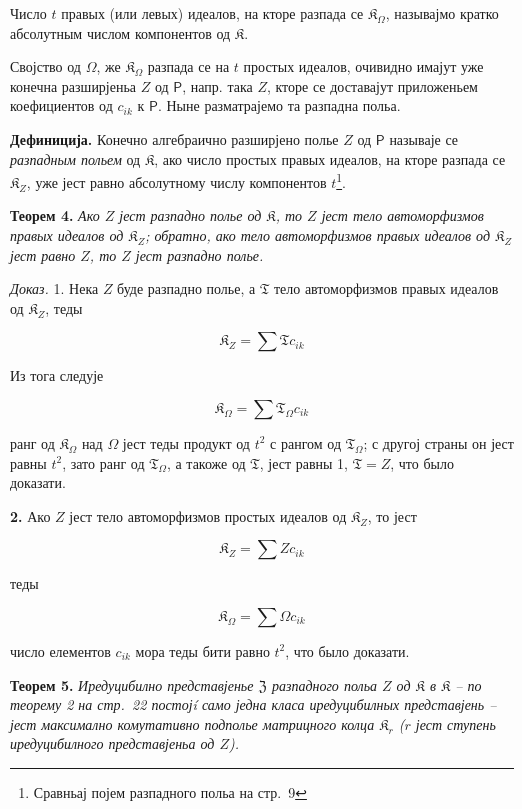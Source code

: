 \documentclass[11pt]{article}
\newcommand{\srcfn}[2]{\footnote{#2}}
\begin{document}
Число \(t\) правых (или левых) идеалов, на кторе разпада се \(\mathfrak K_\Omega\), называјмо кратко абсолутным числом компонентов од \(\mathfrak K\).

Својство од \(\Omega\), же \(\mathfrak K_\Omega\) разпада се на \(t\) простых идеалов, очивидно имајут уже конечна разширјеньа \(Z\) од \(\mathsf P\), напр. така \(Z\), кторе се доставајут приложеньем коефициентов од \(c_{ik}\) к \(\mathsf P\). Ныне разматрајемо та разпадна польа.

\textbf{Дефиниција.} Конечно алгебраично разширјено полье \(Z\) од \(\mathsf P\) называје се \emph{разпадным польем} од \(\mathfrak K\), ако число простых правых идеалов, на кторе разпада се \(\mathfrak K_Z\), уже јест равно абсолутному числу компонентов \(t\)\srcfn{1}{Сравньај појем разпадного польа на стр.~9}.

\textbf{Теорем 4.} \emph{Ако \(Z\) јест разпадно полье од \(\mathfrak K\), то \(Z\) јест тело автоморфизмов правых идеалов од \(\mathfrak K_Z\); обратно, ако тело автоморфизмов правых идеалов од \(\mathfrak K_Z\) јест равно \(Z\), то \(Z\) јест разпадно полье.}

\emph{Доказ.} 1. Нека \(Z\) буде разпадно полье, а \(\mathfrak T\) тело автоморфизмов правых идеалов од \(\mathfrak K_Z\), теды

\[
\mathfrak K_Z=\sum\mathfrak T c_{ik}
\]

Из тога следује

\[
\mathfrak K_\Omega=\sum\mathfrak T_\Omega c_{ik}
\]

ранг од \(\mathfrak K_\Omega\) над \(\Omega\) јест теды продукт од \(t^2\) с рангом од \(\mathfrak T_\Omega\); с другој страны он јест равны \(t^2\), зато ранг од \(\mathfrak T_\Omega\), а такоже од \(\mathfrak T\), јест равны 1, \(\mathfrak T=Z\), что было доказати.

\textbf{2.} Ако \(Z\) јест тело автоморфизмов простых идеалов од \(\mathfrak K_Z\), то јест

\[
\mathfrak K_Z=\sum Zc_{ik}
\]

теды

\[
\mathfrak K_\Omega=\sum\Omega c_{ik}
\]

число елементов \(c_{ik}\) мора теды бити равно \(t^2\), что было доказати.

\textbf{Теорем 5.} \emph{Иредуцибилно представјенье \(\mathfrak Z\) разпадного польа \(Z\) од \(\mathfrak K\) в \(\mathfrak K\) -- по теорему 2 на стр.~22 постојí само једна класа иредуцибилных представјень -- јест максимално комутативно подполье матрицного колца \(\mathfrak K_r\) (\(r\) јест ступень иредуцибилного представјеньа од \(Z\)).}
\end{document}
